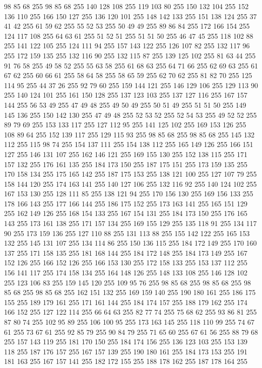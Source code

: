 98 85 68 255 98 85 68 255 140 128 108 255 119 103 80 255 150 132 104 255 152 136 110 255 166 150 127 255 136 120 101 255 148 142 133 255 151 138 124 255 37 41 42 255 61 59 62 255 55 52 53 255 50 49 49 255 89 86 84 255 172 166 154 255 124 117 108 255 64 63 61 255 51 52 51 255 51 51 50 255 46 47 45 255 118 102 88 255 141 122 105 255 124 111 94 255 157 143 122 255 126 107 82 255 132 117 96 255 172 159 135 255 132 116 90 255 132 115 87 255 139 125 102 255 81 63 44 255 91 76 58 255 49 58 52 255 55 63 58 255 61 68 63 255 64 71 66 255 62 69 63 255 61 67 62 255 60 66 61 255 58 64 58 255 58 65 59 255 62 70 62 255 81 82 70 255 125 114 95 255 44 37 26 255 92 79 60 255 159 144 121 255 146 129 106 255 129 113 90 255 140 124 101 255 161 150 128 255 137 123 103 255 137 127 116 255 167 157 144 255 56 53 49 255 47 49 48 255 49 50 49 255 50 51 49 255 51 51 50 255 149 145 136 255 150 142 130 255 47 49 48 255 52 53 52 255
52 54 53 255 49 52 52 255 89 79 69 255 153 133 117 255 127 112 95 255 141 125 102 255 169 153 126 255 108 89 64 255 152 139 117 255 129 115 93 255 98 85 68 255 98 85 68 255 145 132 112 255 115 98 74 255 154 137 111 255 154 138 112 255 165 149 126 255 166 151 127 255 146 131 107 255 162 146 121 255 169 155 130 255 152 138 115 255 171 157 132 255 176 161 135 255 184 173 150 255 187 175 151 255 173 159 135 255 170 158 134 255 175 165 142 255 187 175 153 255 138 121 100 255 127 107 79 255 158 144 120 255 174 163 141 255 140 127 106 255 132 116 92 255 140 124 102 255 167 153 130 255 128 111 85 255 138 121 94 255 170 156 130 255 169 156 133 255 178 166 143 255 177 166 144 255 186 175 152 255 173 163 141 255 165 151 129 255 162 149 126 255 168 154 133 255 167 154 131 255 184 173 150 255 176 165 143 255 173 161 138 255 171 157 134 255 169 155 129 255 135 118 91 255 134 117 90 255 173 159 136 255 127 110 88 255 131 113 88 255 155 142 122 255 165 153 132 255 145 131 107 255 134 114 86 255
150 136 115 255 184 172 149 255 170 160 137 255 171 158 135 255 181 168 144 255 184 172 148 255 184 173 149 255 167 152 126 255 166 152 126 255 166 153 130 255 172 158 133 255 153 137 112 255 156 141 117 255 174 158 134 255 164 148 126 255 148 133 108 255 146 128 102 255 123 106 83 255 159 145 120 255 109 95 76 255 98 85 68 255 98 85 68 255 98 85 68 255 98 85 68 255 162 151 132 255 169 159 140 255 190 180 161 255 186 175 155 255 189 179 161 255 171 161 144 255 184 174 157 255 188 179 162 255 174 166 152 255 127 122 114 255 66 64 63 255 82 77 74 255 75 68 62 255 93 86 81 255 87 80 74 255 102 95 89 255 106 100 95 255 173 163 145 255 118 110 99 255 74 67 61 255 73 67 61 255 92 85 79 255 90 84 79 255 71 65 60 255 67 61 56 255 88 79 68 255 157 143 119 255 181 170 150 255 184 174 156 255 136 123 103 255 153 139 118 255 187 176 157 255 167 157 139 255 190 180 161 255 184 173 153 255 191 181 163 255 167 157 141 255 182 172 155 255 188 178 162 255 187 178 164 255
